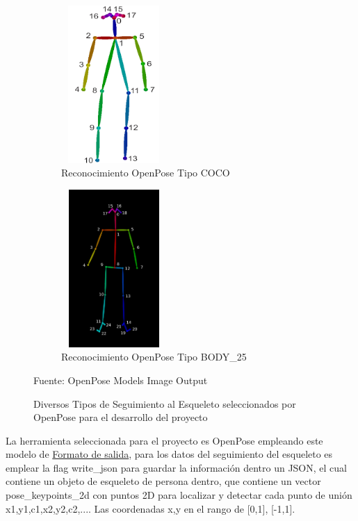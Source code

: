 \begin{figure}[ht]
	\centering
	\begin{subfigure}{.5\textwidth}
		\centering
		\includegraphics[width=4cm,height=6cm]{./Images/openposet1.png}
		\caption{Reconocimiento OpenPose Tipo COCO}
		\label{open1}
	\end{subfigure}%
	\begin{subfigure}{.5\textwidth}
		\centering
		\includegraphics[width=4cm,height=6cm]{./Images/openposet2.png}
		\caption{Reconocimiento OpenPose Tipo BODY\_25}
		\label{open2}
	\end{subfigure}
	\caption{Diversos Tipos de Seguimiento al Esqueleto seleccionados por OpenPose para el desarrollo del proyecto}
	\label{exampleesqueletotrack}
	\footnotesize Fuente: OpenPose Models Image Output \cite{cao2017realtime} \cite{8765346}
\end{figure}

La herramienta seleccionada para el proyecto es OpenPose empleando este modelo de \href{https://github.com/CMU-Perceptual-Computing-Lab/openpose/blob/master/doc/output.md}{Formato de salida}, para los datos del seguimiento del esqueleto es emplear la flag write\_json para guardar la información dentro un JSON, el cual contiene un objeto de esqueleto de persona dentro, que contiene un vector pose\_keypoints\_2d con puntos 2D para localizar y detectar cada punto de unión x1,y1,c1,x2,y2,c2,.... Las coordenadas x,y en el rango de [0,1], [-1,1].

